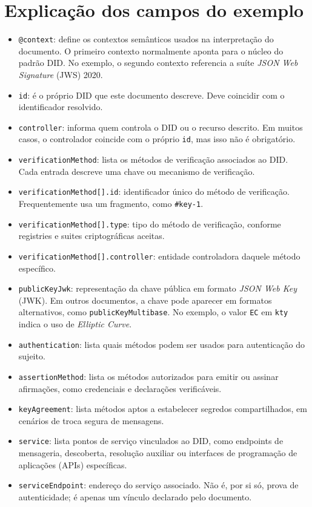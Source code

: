 \section{Explicação dos campos do exemplo}
\begin{itemize}[leftmargin=*]
  \item \texttt{@context}: define os contextos semânticos usados na interpretação do documento. O primeiro contexto normalmente aponta para o núcleo do padrão DID. No exemplo, o segundo contexto referencia a suíte \textit{JSON Web Signature} (JWS) 2020.
  \item \texttt{id}: é o próprio DID que este documento descreve. Deve coincidir com o identificador resolvido.
  \item \texttt{controller}: informa quem controla o DID ou o recurso descrito. Em muitos casos, o controlador coincide com o próprio \texttt{id}, mas isso não é obrigatório.
  \item \texttt{verificationMethod}: lista os métodos de verificação associados ao DID. Cada entrada descreve uma chave ou mecanismo de verificação.
  \item \texttt{verificationMethod[].id}: identificador único do método de verificação. Frequentemente usa um fragmento, como \texttt{\#key-1}.
  \item \texttt{verificationMethod[].type}: tipo do método de verificação, conforme registries e suites criptográficas aceitas.
  \item \texttt{verificationMethod[].controller}: entidade controladora daquele método específico.
  \item \texttt{publicKeyJwk}: representação da chave pública em formato \textit{JSON Web Key} (JWK). Em outros documentos, a chave pode aparecer em formatos alternativos, como \texttt{publicKeyMultibase}. No exemplo, o valor \texttt{EC} em \texttt{kty} indica o uso de \textit{Elliptic Curve}.
  \item \texttt{authentication}: lista quais métodos podem ser usados para autenticação do sujeito.
  \item \texttt{assertionMethod}: lista os métodos autorizados para emitir ou assinar afirmações, como credenciais e declarações verificáveis.
  \item \texttt{keyAgreement}: lista métodos aptos a estabelecer segredos compartilhados, em cenários de troca segura de mensagens.
  \item \texttt{service}: lista pontos de serviço vinculados ao DID, como endpoints de mensageria, descoberta, resolução auxiliar ou interfaces de programação de aplicações (APIs) específicas.
  \item \texttt{serviceEndpoint}: endereço do serviço associado. Não é, por si só, prova de autenticidade; é apenas um vínculo declarado pelo documento.
\end{itemize}

